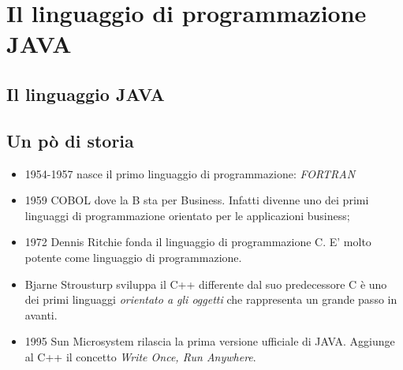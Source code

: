 \section{Il linguaggio di programmazione JAVA}
\begin{frame}
\begin{block}{}
\begin{center}
\large{}
\end{center}
\end{block}
\end{frame}

\subsection{Il linguaggio JAVA}
\subsection{Un pò di storia}
\begin{frame}
\begin{block}{}
\begin{itemize}
\item 1954-1957 nasce il primo linguaggio di programmazione: \itshape{FORTRAN}
\item 1959 COBOL dove la B sta per Business. Infatti divenne uno dei primi linguaggi di 
programmazione orientato per le applicazioni business;
\item 1972 Dennis Ritchie fonda il linguaggio di programmazione C. E' molto potente come linguaggio di 
programmazione. 
\item Bjarne Strousturp sviluppa il C++ differente dal suo predecessore C è uno dei primi linguaggi
\textit{orientato a gli oggetti} che rappresenta un grande passo in avanti.
\item 1995 Sun Microsystem rilascia la prima versione ufficiale di JAVA. Aggiunge al C++ il concetto
\textit{Write Once, Run Anywhere}.
\end{itemize}
\end{block}
\end{frame}

